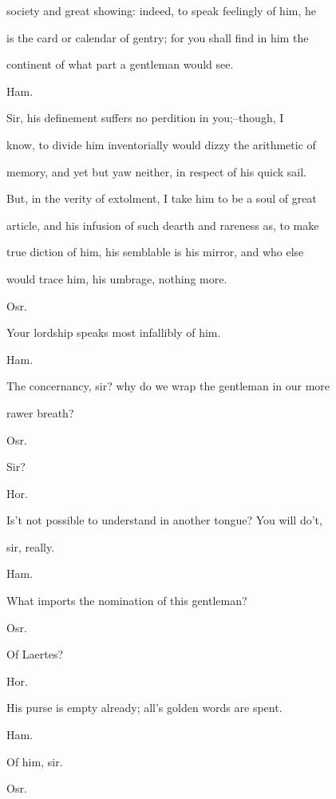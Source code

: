 \documentclass[12pt]{book}
\begin{document}
society and great showing: indeed, to speak feelingly of him, he

is the card or calendar of gentry; for you shall find in him the

continent of what part a gentleman would see.



Ham.

Sir, his definement suffers no perdition in you;--though, I

know, to divide him inventorially would dizzy the arithmetic of

memory, and yet but yaw neither, in respect of his quick sail.

But, in the verity of extolment, I take him to be a soul of great

article, and his infusion of such dearth and rareness as, to make

true diction of him, his semblable is his mirror, and who else

would trace him, his umbrage, nothing more.



Osr.

Your lordship speaks most infallibly of him.



Ham.

The concernancy, sir? why do we wrap the gentleman in our more

rawer breath?



Osr.

Sir?



Hor.

Is't not possible to understand in another tongue? You will do't,

sir, really.



Ham.

What imports the nomination of this gentleman?



Osr.

Of Laertes?



Hor.

His purse is empty already; all's golden words are spent.



Ham.

Of him, sir.



Osr.
\end{document}
